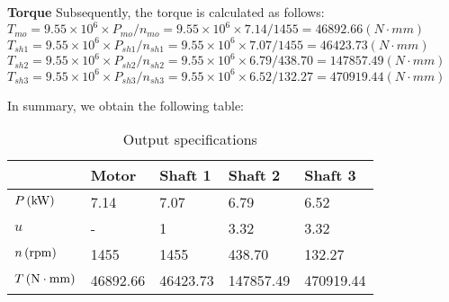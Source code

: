\textbf{Torque} Subsequently, the torque is calculated as follows:\\
$ T_{mo}  = 9.55\times10^6 \times P_{mo}/n_{mo} = 9.55\times10^6 \times 7.14/1455 = 46892.66 \unit{(N\cdot mm)}$\\
$ T_{sh1} = 9.55\times10^6 \times {P_{sh1}}/{n_{sh1}} = 9.55\times10^6 \times 7.07/1455 = 46423.73 \unit{(N\cdot mm)}$\\
$ T_{sh2} = 9.55\times10^6 \times {P_{sh2}}/{n_{sh2}} = 9.55\times10^6 \times 6.79/438.70 = 147857.49 \unit{(N\cdot mm)}$\\
$ T_{sh3} = 9.55\times10^6 \times {P_{sh3}}/{n_{sh3}} = 9.55\times10^6 \times 6.52/132.27 = 470919.44 \unit{(N\cdot mm)}$

In summary, we obtain the following table:
\begin{table}[ht]
	\centering
	\begin{tabular}{lllll}\toprule
		&Motor    & Shaft 1  & Shaft 2  & Shaft 3   \\\midrule
		$ P \, (\mathrm{kW})$ & 7.14  & 7.07   & 6.79   & 6.52   \\
		$ u $ &       -   &1    &  3.32  & 3.32                 \\
		$ n \, (\mathrm{rpm})$ & 1455 & 1455  & 438.70 & 132.27 \\
		$ T \, (\mathrm{N\cdot mm})$ & 46892.66 & 46423.73 & 147857.49 & 470919.44\\
		\bottomrule
	\end{tabular}
	\caption{Output specifications}
	\label{tab:my-table}
\end{table}
